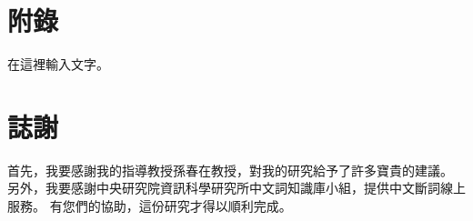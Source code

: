 \documentclass[letterpaper, 10pt, conference]{ieeeconf}   %
\begin{document}
\begin{CJK}{UTF8}{bsmi}

\section*{附錄}

在這裡輸入文字。%

\section*{誌謝}

首先，我要感謝我的指導教授孫春在教授，對我的研究給予了許多寶貴的建議。%
另外，我要感謝中央研究院資訊科學研究所中文詞知識庫小組，提供中文斷詞線上服務。%
有您們的協助，這份研究才得以順利完成。%





\end{CJK}
\end{document}
